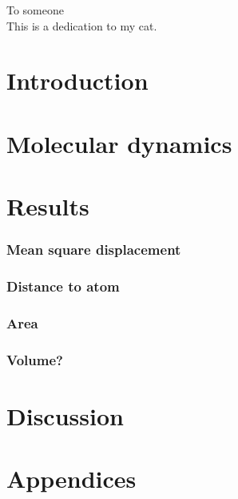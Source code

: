 \documentclass[twoside,english,a4paper]{uiofysmaster}
\begin{document}

\cleardoublepage

\begin{abstract}
\lipsum
\end{abstract}

\begin{dedication}
  To someone
  \\\vspace{12pt}
  This is a dedication to my cat.
\end{dedication}

\begin{acknowledgements}
  \lipsum
\end{acknowledgements}

\tableofcontents

\listoffigures
\listoftables
\listoflistings


\part{Introduction}

\part{Molecular dynamics}
    



\part{Results}
    \section{Mean square displacement}
    \section{Distance to atom}
    \section{Area}
    \section{Volume?}

\part{Discussion}

\part{Appendices}

\printbibliography
% 
\end{document}

